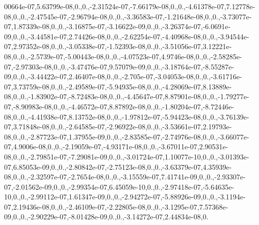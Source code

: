 {00664e-\/07,5.\-63799e-\/08,0.,0.,-\/2.\-31524e-\/07,-\/7.\-66179e-\/08,0.,0.,-\/4.\-61378e-\/07,7.\-12778e-\/08,0.,0.,-\/2.\-47545e-\/07,-\/2.\-96794e-\/08,0.,0.,-\/3.\-36583e-\/07,-\/1.\-21648e-\/08,0.,0.,-\/3.\-73077e-\/07,1.\-87339e-\/08,0.,0.,-\/3.\-16875e-\/07,-\/3.\-16622e-\/09,0.,0.,-\/3.\-26374e-\/07,-\/6.\-0691e-\/09,0.,0.,-\/3.\-44581e-\/07,2.\-74426e-\/08,0.,0.,-\/2.\-62254e-\/07,-\/4.\-40968e-\/08,0.,0.,-\/3.\-94544e-\/07,2.\-97352e-\/08,0.,0.,-\/3.\-05338e-\/07,-\/1.\-52393e-\/08,0.,0.,-\/3.\-51056e-\/07,3.\-12221e-\/08,0.,0.,-\/2.\-5739e-\/07,-\/5.\-00443e-\/08,0.,0.,-\/4.\-07523e-\/07,4.\-9746e-\/08,0.,0.,-\/2.\-58285e-\/07,-\/2.\-97303e-\/08,0.,0.,-\/3.\-47476e-\/07,9.\-57079e-\/09,0.,0.,-\/3.\-18764e-\/07,-\/8.\-55287e-\/09,0.,0.,-\/3.\-44422e-\/07,2.\-46407e-\/08,0.,0.,-\/2.\-705e-\/07,-\/3.\-04053e-\/08,0.,0.,-\/3.\-61716e-\/07,3.\-73759e-\/08,0.,0.,-\/2.\-49589e-\/07,-\/5.\-94935e-\/08,0.,0.,-\/4.\-28069e-\/07,8.\-13889e-\/08,0.,0.,-\/1.\-83902e-\/07,-\/8.\-72483e-\/08,0.,0.,-\/4.\-45647e-\/07,8.\-87901e-\/08,0.,0.,-\/1.\-79277e-\/07,-\/8.\-90983e-\/08,0.,0.,-\/4.\-46572e-\/07,8.\-87892e-\/08,0.,0.,-\/1.\-80204e-\/07,-\/8.\-72446e-\/08,0.,0.,-\/4.\-41938e-\/07,8.\-13752e-\/08,0.,0.,-\/1.\-97812e-\/07,-\/5.\-94423e-\/08,0.,0.,-\/3.\-76139e-\/07,3.\-71848e-\/08,0.,0.,-\/2.\-64585e-\/07,-\/2.\-96922e-\/08,0.,0.,-\/3.\-53661e-\/07,2.\-19793e-\/08,0.,0.,-\/2.\-87723e-\/07,1.\-37955e-\/09,0.,0.,-\/2.\-83585e-\/07,-\/2.\-74976e-\/08,0.,0.,-\/3.\-66077e-\/07,4.\-9006e-\/08,0.,0.,-\/2.\-19059e-\/07,-\/4.\-93171e-\/08,0.,0.,-\/3.\-67011e-\/07,2.\-90531e-\/08,0.,0.,-\/2.\-79851e-\/07,-\/7.\-29081e-\/09,0.,0.,-\/3.\-01724e-\/07,1.\-10077e-\/10,0.,0.,-\/3.\-01393e-\/07,6.\-85053e-\/09,0.,0.,-\/2.\-80842e-\/07,-\/2.\-75123e-\/08,0.,0.,-\/3.\-63379e-\/07,4.\-35939e-\/08,0.,0.,-\/2.\-32597e-\/07,-\/2.\-7654e-\/08,0.,0.,-\/3.\-15559e-\/07,7.\-41741e-\/09,0.,0.,-\/2.\-93307e-\/07,-\/2.\-01562e-\/09,0.,0.,-\/2.\-99354e-\/07,6.\-45059e-\/10,0.,0.,-\/2.\-97418e-\/07,-\/5.\-64635e-\/10,0.,0.,-\/2.\-99112e-\/07,1.\-61347e-\/09,0.,0.,-\/2.\-94272e-\/07,-\/5.\-88926e-\/09,0.,0.,-\/3.\-1194e-\/07,2.\-19436e-\/08,0.,0.,-\/2.\-46109e-\/07,-\/2.\-22805e-\/08,0.,0.,-\/3.\-1295e-\/07,7.\-57368e-\/09,0.,0.,-\/2.\-90229e-\/07,-\/8.\-01428e-\/09,0.,0.,-\/3.\-14272e-\/07,2.\-44834e-\/08,0.}
